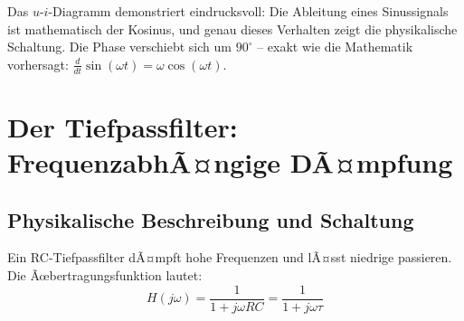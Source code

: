 ﻿\documentclass[12pt, a4paper]{article}
\begin{document}
	Das $u$-$i$-Diagramm demonstriert eindrucksvoll: Die Ableitung eines Sinussignals ist mathematisch der Kosinus, und genau dieses Verhalten zeigt die physikalische Schaltung. Die Phase verschiebt sich um $90^\circ$ -- exakt wie die Mathematik vorhersagt: $\frac{d}{dt}\sin(\omega t) = \omega\cos(\omega t)$.
	
	\section{Der Tiefpassfilter: FrequenzabhÃ¤ngige DÃ¤mpfung}
	
	\subsection{Physikalische Beschreibung und Schaltung}
	
	Ein RC-Tiefpassfilter dÃ¤mpft hohe Frequenzen und lÃ¤sst niedrige passieren. Die Ãœbertragungsfunktion lautet:
	\begin{equation}
		H(j\omega) = \frac{1}{1 + j\omega RC} = \frac{1}{1 + j\omega\tau}
	\end{equation}
	
\end{document}
